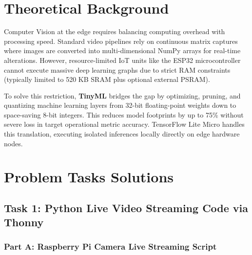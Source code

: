 \documentclass[12pt,a4paper]{article}
\begin{document}
\vspace{0.8cm}

\section{Theoretical Background}

Computer Vision at the edge requires balancing computing overhead with processing speed. Standard video pipelines rely on continuous matrix captures where images are converted into multi-dimensional NumPy arrays for real-time alterations. However, resource-limited IoT units like the ESP32 microcontroller cannot execute massive deep learning graphs due to strict RAM constraints (typically limited to 520 KB SRAM plus optional external PSRAM).

To solve this restriction, \textbf{TinyML} bridges the gap by optimizing, pruning, and quantizing machine learning layers from 32-bit floating-point weights down to space-saving 8-bit integers. This reduces model footprints by up to 75\% without severe loss in target operational metric accuracy. TensorFlow Lite Micro handles this translation, executing isolated inferences locally directly on edge hardware nodes.

\newpage

\section{Problem Tasks Solutions}

\subsection*{Task 1: Python Live Video Streaming Code via Thonny}

\subsubsection*{Part A: Raspberry Pi Camera Live Streaming Script}
\end{document}
